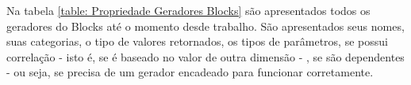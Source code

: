 \documentclass[
	12pt,				%
	openright,			%
	oneside,			%
	a4paper,			%
	english,			%
	brazil				%
	]{abntex2}
\begin{document}
		
		Na tabela \ref{table: Propriedade Geradores Blocks} são apresentados todos os geradores do Blocks até o momento desde trabalho.
		São apresentados seus nomes, suas categorias, o tipo de valores retornados, os tipos de parâmetros, se possui correlação - isto é, se é baseado no valor de outra dimensão - , se são dependentes - ou seja, se precisa de um gerador encadeado para funcionar corretamente.

\end{document}
